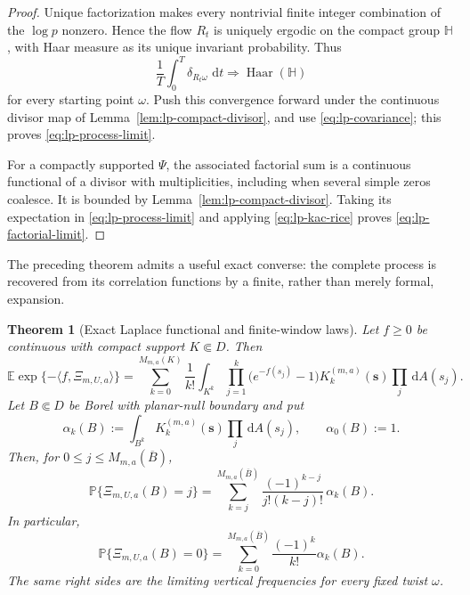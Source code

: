 \documentclass[11pt]{article}
\newtheorem{theorem}{Theorem}[section]
\theoremstyle{definition}
\theoremstyle{remark}
\newcommand{\dd}{\,\mathrm d}
\begin{document}
\begin{proof}
Unique factorization makes every nontrivial finite integer combination of the
$\log p$ nonzero.  Hence the flow $R_t$ is uniquely ergodic on the compact
group $\mathbb H$, with Haar measure as its unique invariant probability.
Thus
\[
 \frac1T\int_0^T\delta_{R_t\omega}\,\dd t
 \Longrightarrow\operatorname{Haar}(\mathbb H)
\]
for every starting point $\omega$.  Push this convergence forward under the
continuous divisor map of Lemma~\ref{lem:lp-compact-divisor}, and use
\eqref{eq:lp-covariance}; this proves \eqref{eq:lp-process-limit}.

For a compactly supported $\Psi$, the associated factorial sum is a continuous
functional of a divisor with multiplicities, including when several simple
zeros coalesce.  It is bounded by Lemma~\ref{lem:lp-compact-divisor}.  Taking
its expectation in \eqref{eq:lp-process-limit} and applying
\eqref{eq:lp-kac-rice} proves \eqref{eq:lp-factorial-limit}.
\end{proof}

The preceding theorem admits a useful exact converse: the complete process is
recovered from its correlation functions by a finite, rather than merely
formal, expansion.

\begin{theorem}[Exact Laplace functional and finite-window laws]
\label{thm:lp-laplace}
Let $f\geq0$ be continuous with compact support $K\Subset D$.  Then
\begin{equation}
 \boxed{
 {\mathbb E}\exp\{-\langle f,\Xi_{m,U,a}\rangle\}
 =\sum_{k=0}^{M_{m,a}(K)}\frac1{k!}
 \int_{K^k}\prod_{j=1}^k\bigl(e^{-f(s_j)}-1\bigr)
 K_k^{(m,a)}(\mathbf s)\prod_j\dd A(s_j).
 }
 \label{eq:lp-laplace}
\end{equation}
Let $B\Subset D$ be Borel with planar-null boundary and put
\[
 \alpha_k(B):=\int_{B^k}K_k^{(m,a)}(\mathbf s)\prod_j\dd A(s_j),
 \qquad \alpha_0(B):=1.
\]
Then, for $0\leq j\leq M_{m,a}(\overline B)$,
\begin{equation}
 \boxed{
 {\mathbb P}\{\Xi_{m,U,a}(B)=j\}
 =\sum_{k=j}^{M_{m,a}(\overline B)}
 \frac{(-1)^{k-j}}{j!(k-j)!}\,\alpha_k(B).
 }
 \label{eq:lp-count-law}
\end{equation}
In particular,
\begin{equation}
 \boxed{
 {\mathbb P}\{\Xi_{m,U,a}(B)=0\}
 =\sum_{k=0}^{M_{m,a}(\overline B)}\frac{(-1)^k}{k!}\alpha_k(B).
 }
 \label{eq:lp-void}
\end{equation}
The same right sides are the limiting vertical frequencies for every fixed
twist $\omega$.
\end{theorem}
\end{document}
